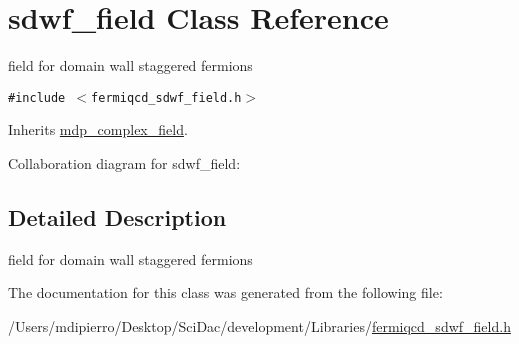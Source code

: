 \hypertarget{classsdwf__field}{
\section{sdwf\_\-field Class Reference}
\label{classsdwf__field}
}
field for domain wall staggered fermions  


{\tt \#include $<$fermiqcd\_\-sdwf\_\-field.h$>$}

Inherits \hyperlink{classmdp__complex__field}{mdp\_\-complex\_\-field}.

Collaboration diagram for sdwf\_\-field:

\subsection{Detailed Description}
field for domain wall staggered fermions 

The documentation for this class was generated from the following file:\begin{CompactItemize}
\item 
/Users/mdipierro/Desktop/SciDac/development/Libraries/\hyperlink{fermiqcd__sdwf__field_8h}{fermiqcd\_\-sdwf\_\-field.h}\end{CompactItemize}
